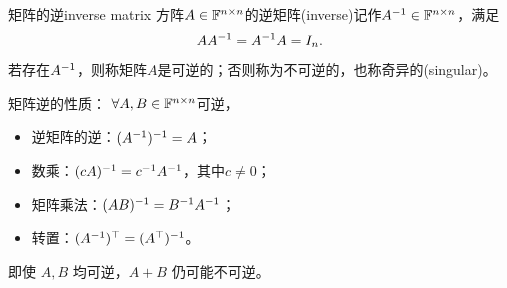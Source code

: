 \begin{definition}{矩阵的逆}{inverse matrix}
	方阵$A \in \mathbb{F}^{n\times n}$的逆矩阵(inverse)记作$A^{-1} \in \mathbb{F}^{n\times n}$，满足
	\begin{equation}\label{eq:la-inverse-definition}
		AA^{-1} = A^{-1} A = I_n.
	\end{equation}
	若存在$A^{-1}$，则称矩阵$A$是可逆的；否则称为不可逆的，也称奇异的(singular)。
\end{definition}

\begin{corollary}
	矩阵逆的性质：
	$\forall A,B \in \mathbb{F}^{n\times n}$可逆，
	\begin{itemize}
		\item 逆矩阵的逆：$(A^{-1})^{-1} = A$；
		\item 数乘：$(cA)^{-1} = c^{-1} A^{-1}$，其中$c \neq 0$；
		\item 矩阵乘法：$(AB)^{-1} = B^{-1} A^{-1}$；
		\item 转置：$(A^{-1})^\top = (A^\top)^{-1}$。
	\end{itemize}
\end{corollary}

\begin{remark}
	即使 $A,B$ 均可逆，$A + B$ 仍可能不可逆。
\end{remark}

